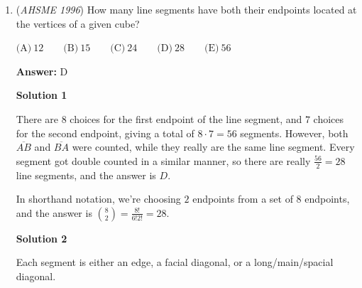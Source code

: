 \begin{enumerate}
Place the points on a coordinate grid, and let the $xy$ plane (where $z=0$) contain triangle $PAB$.  Square $ABCD$ will have sides that are vertical.

 Place point $P$ at $(0,0,0)$, and place $PA$ on the x-axis so that $A(3,0,0)$, and thus $PA = 3$.

 Place $PB$ on the y-axis so that $B(0,4,0)$, and thus $PB = 4$.  This makes $AB = 5$, as it is the hypotenuse of a 3-4-5 right triangle (with the right angle being formed by the x and y axes).  This is a clean use of the fact that $\triangle PAB$ is a right triangle.

 Since $AB$ is one side of $\square ABCD$ with length $5$, $BC = 5$ as well.  Since $BC \perp AB$, and $BC$ is also perpendicular to the $xy$ plane, $BC$ must run stright up and down.  WLOG pick the up direction, and since $BC = 5$, we travel $5$ units up to $C(0,4,5)$.  Similarly, we travel $5$ units up from $A(3,0,0)$ to reach $D(3,0,5)$.

 We now have coordinates for $P$ and $D$.  The distance is $\sqrt{(5-0)^2 + (0-0)^2 + (3-0)^2} = \sqrt{34}$, which is option $\boxed{\text{B}}$.

 


	\item (\textit{AHSME 1996}) How many line segments have both their endpoints located at the vertices of a given cube?


 $\text{(A)}\ 12\qquad\text{(B)}\ 15\qquad\text{(C)}\ 24\qquad\text{(D)}\ 28\qquad\text{(E)}\ 56$

 \textbf{Answer: }D



\textbf{Solution 1}

There are $8$ choices for the first endpoint of the line segment, and $7$ choices for the second endpoint, giving a total of $8\cdot 7 = 56$ segments.  However, both $\overline{AB}$ and $\overline{BA}$ were counted, while they really are the same line segment.  Every segment got double counted in a similar manner, so there are really $\frac{56}{2} = 28$ line segments, and the answer is $\boxed{D}$.

 In shorthand notation, we're choosing $2$ endpoints from a set of $8$ endpoints, and the answer is $\binom{8}{2} = \frac{8!}{6!2!} = 28$.

 



\textbf{Solution 2}

Each segment is either an edge, a facial diagonal, or a long/main/spacial diagonal.


\end{enumerate}
